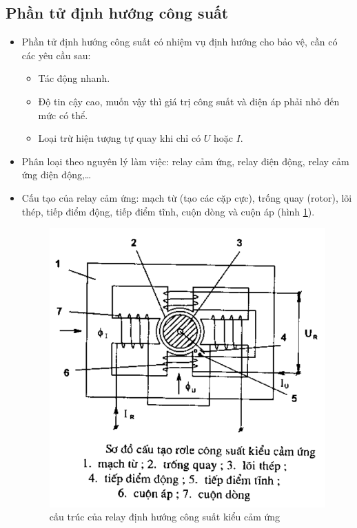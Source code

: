 \documentclass[12pt,a4paper]{article}
\begin{document}
\subsection{Phần tử định hướng công suất}	
	\begin{itemize}
		\item Phần tử định hướng công suất có nhiệm vụ định hướng cho bảo vệ, cần có các yêu cầu sau:
			\begin{itemize}
				\item Tác động nhanh.
				
				\item Độ tin cậy cao, muốn vậy thì giá trị công suất và điện áp phải nhỏ đến mức có thể.
				
				\item Loại trừ hiện tượng tự quay khi chỉ có $U$ hoặc $I$.				
			\end{itemize}
			
		\item Phân loại theo nguyên lý làm việc: relay cảm ứng, relay điện động, relay cảm ứng điện động,\ldots
		
		\item Cấu tạo của relay cảm ứng: mạch từ (tạo các cặp cực), trống quay (rotor), lõi thép, tiếp điểm động, tiếp điểm tĩnh, cuộn dòng và cuộn áp (hình \ref{Fig:cautao-relay-dinhhuongcongsuat}).				
		
			\begin{figure}[!h]
				\begin{center}					
					\includegraphics[scale=.5]{images/relay-dinhhuong-cuongsuat.png} 
				\end{center}
				\caption{cấu trúc của relay định hướng công suất kiểu cảm ứng} \label{Fig:cautao-relay-dinhhuongcongsuat}
			\end{figure}
	

\end{itemize}
\end{document}
